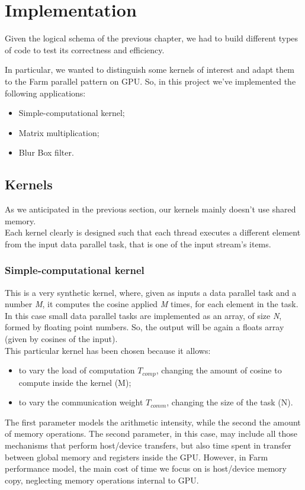 \chapter{Implementation} 
\label{chap:impl}
Given the logical schema of the previous chapter, we had to build different types of code to test its correctness and efficiency.

In particular, we wanted to distinguish some kernels of interest and adapt them to the Farm parallel pattern on GPU. So, in this project we've implemented the following applications:
\begin{itemize}
	\item Simple-computational kernel;
	\item Matrix multiplication;
	\item Blur Box filter.
\end{itemize}

\section{Kernels}
As we anticipated in the previous section, our kernels mainly doesn't use shared memory.\\
Each kernel clearly is designed such that each thread executes a different element from the input data parallel task, that is one of the input stream's items.
\subsection{Simple-computational kernel}
	This is a very synthetic kernel, where, given as inputs a data parallel task and a number \textit{M}, it computes the cosine applied \textit{M} times, for each element in the task.
	In this case small data parallel tasks are implemented as an array, of size \textit{N}, formed by floating point numbers. So, the output will be again a floats array (given by cosines of the input).\\
	This particular kernel has been chosen because it allows:
	\begin{itemize}
		\item to vary the load of computation \(T_{comp}\), changing the amount of cosine to compute inside the kernel (M);
		\item to vary the communication weight \(T_{comm}\), changing the size of the task (N).
	\end{itemize} 
	The first parameter models the arithmetic intensity, while the second the amount of memory operations.
	The second parameter, in this case, may include all those mechanisms that perform host/device transfers, but also time spent in transfer between global memory and registers inside the GPU.
	However, in Farm performance model, the main cost of time we focus on is host/device memory copy, neglecting memory operations internal to GPU.

